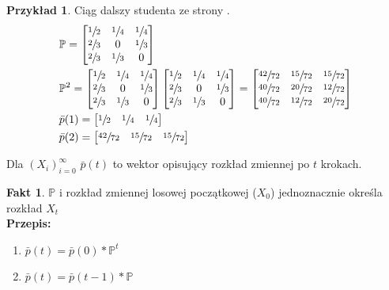 \documentclass[a4paper,12pt]{article}
\theoremstyle{definition}%
\newtheorem*{fact*}{Fakt} %
\newtheorem{example}{Przykład}
\newtheorem*{example*}{Przykład} %
\theoremstyle{definition}
\theoremstyle{problem}
\begin{document}
\begin{example*}
Ciąg dalszy studenta ze strony \pageref{exa:student}.
\begin{align*}
&\mathbb{P}=\begin{bmatrix}
\sfrac{1}{2} & \sfrac{1}{4} & \sfrac{1}{4} \\
\sfrac{2}{3} & 0 & \sfrac{1}{3}\\
\sfrac{2}{3} & \sfrac{1}{3} &0 
\end{bmatrix}\\
&\mathbb{P}^2=\begin{bmatrix}
\sfrac{1}{2} & \sfrac{1}{4} & \sfrac{1}{4} \\
\sfrac{2}{3} & 0 & \sfrac{1}{3}\\
\sfrac{2}{3} & \sfrac{1}{3} &0 
\end{bmatrix}\begin{bmatrix}
\sfrac{1}{2} & \sfrac{1}{4} & \sfrac{1}{4} \\
\sfrac{2}{3} & 0 & \sfrac{1}{3}\\
\sfrac{2}{3} & \sfrac{1}{3} &0 
\end{bmatrix}=\begin{bmatrix}
\sfrac{42}{72} & \sfrac{15}{72} & \sfrac{15}{72} \\
\sfrac{40}{72} & \sfrac{20}{72} & \sfrac{12}{72}\\
\sfrac{40}{72} & \sfrac{12}{72} & \sfrac{20}{72}
\end{bmatrix}\\
&\bar{p}(1)=\begin{bmatrix}
\sfrac{1}{2} & \sfrac{1}{4} & \sfrac{1}{4}
\end{bmatrix}\\
&\bar{p}(2)=\begin{bmatrix}
\sfrac{42}{72} & \sfrac{15}{72} & \sfrac{15}{72}
\end{bmatrix}
\end{align*}
\end{example*}

Dla $(X_i)_{i=0}^\infty$ $\bar{p}(t)$ to wektor opisujący rozkład zmiennej po $t$ krokach.

\begin{fact*}
$\mathbb{P}$ i rozkład zmiennej losowej początkowej ($X_0$) jednoznacznie określa rozkład $X_t$\\
\textbf{Przepis:}
\begin{enumerate}[label=\arabic*.]
\item $\bar{p}(t)=\bar{p}(0)*\mathbb{P}^t$
\item $\bar{p}(t)=\bar{p}(t-1)*\mathbb{P}$
\end{enumerate}
\end{fact*}
\end{document}
